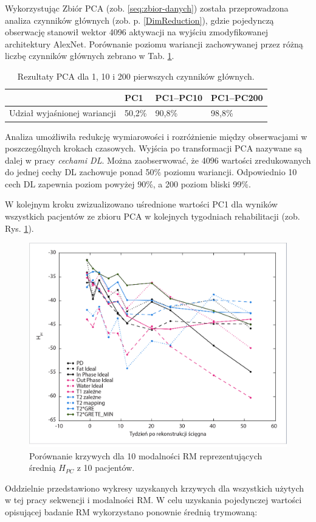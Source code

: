 Wykorzystując Zbiór PCA (zob. \ref{seq:zbior-danych}) została przeprowadzona analiza czynników głównych (zob. p. \ref{DimReduction}), gdzie pojedynczą obserwację stanowił wektor 4096 aktywacji na wyjściu zmodyfikowanej architektury AlexNet. Porównanie poziomu wariancji zachowywanej przez różną liczbę czynników głównych zebrano w Tab. \ref{PCA-results}.
\vspace{10px}
\renewcommand{\arraystretch}{1.2}
\begin{table}[h!]
 \setlength{\tabcolsep}{12pt}
 \centering
 \caption{Rezultaty PCA dla 1, 10 i 200 pierwszych czynników głównych.}
 \label{PCA-results}
 \begin{tabular}{l|l|l|l}
 
 & PC1 & PC1--PC10 & PC1--PC200 \\ \hline \hline
 Udział wyjaśnionej wariancji & 50,2\% & 90,8\%   & 98,8\% \\ \hline 
 \end{tabular}
 \end{table}
\renewcommand{\arraystretch}{1}

Analiza umożliwiła redukcję wymiarowości i rozróżnienie między obserwacjami w poszczególnych krokach czasowych. Wyjścia po transformacji PCA nazywane \linebreak są dalej w pracy \textit{cechami DL}. Można zaobserwować, że 4096 wartości zredukowanych do jednej cechy DL zachowuje ponad 50\% poziomu wariancji. Odpowiednio 10 cech DL zapewnia poziom powyżej 90\%, a 200 poziom bliski 99\%. 

W kolejnym kroku zwizualizowano uśrednione wartości PC1 dla wyników wszystkich pacjentów ze zbioru PCA w kolejnych tygodniach rehabilitacji (zob. Rys. \ref{fig:H}).

\begin{figure}[h!]
	\centering
	\includegraphics[width=1\textwidth]{figures/H_PC1.jpg}
	\caption{Porównanie krzywych dla 10 modalności RM reprezentujących średnią $H_{PC}$ z 10 pacjentów.}\label{fig:H}
\end{figure}
Oddzielnie przedstawiono wykresy uzyskanych krzywych dla wszystkich użytych w tej pracy sekwencji i modalności RM. W celu uzyskania pojedynczej wartości opisującej badanie RM wykorzystano ponownie średnią trymowaną:

